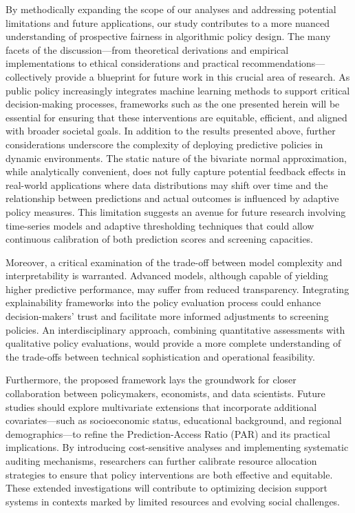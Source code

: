 \documentclass{article}
\begin{document}
By methodically expanding the scope of our analyses and addressing potential limitations and future applications, our study contributes to a more nuanced understanding of prospective fairness in algorithmic policy design. The many facets of the discussion—from theoretical derivations and empirical implementations to ethical considerations and practical recommendations—collectively provide a blueprint for future work in this crucial area of research. As public policy increasingly integrates machine learning methods to support critical decision-making processes, frameworks such as the one presented herein will be essential for ensuring that these interventions are equitable, efficient, and aligned with broader societal goals.
In addition to the results presented above, further considerations underscore the complexity of deploying predictive policies in dynamic environments. The static nature of the bivariate normal approximation, while analytically convenient, does not fully capture potential feedback effects in real-world applications where data distributions may shift over time and the relationship between predictions and actual outcomes is influenced by adaptive policy measures. This limitation suggests an avenue for future research involving time-series models and adaptive thresholding techniques that could allow continuous calibration of both prediction scores and screening capacities.

Moreover, a critical examination of the trade-off between model complexity and interpretability is warranted. Advanced models, although capable of yielding higher predictive performance, may suffer from reduced transparency. Integrating explainability frameworks into the policy evaluation process could enhance decision-makers’ trust and facilitate more informed adjustments to screening policies. An interdisciplinary approach, combining quantitative assessments with qualitative policy evaluations, would provide a more complete understanding of the trade-offs between technical sophistication and operational feasibility.

Furthermore, the proposed framework lays the groundwork for closer collaboration between policymakers, economists, and data scientists. Future studies should explore multivariate extensions that incorporate additional covariates—such as socioeconomic status, educational background, and regional demographics—to refine the Prediction-Access Ratio (PAR) and its practical implications. By introducing cost-sensitive analyses and implementing systematic auditing mechanisms, researchers can further calibrate resource allocation strategies to ensure that policy interventions are both effective and equitable. These extended investigations will contribute to optimizing decision support systems in contexts marked by limited resources and evolving social challenges.
\end{document}

